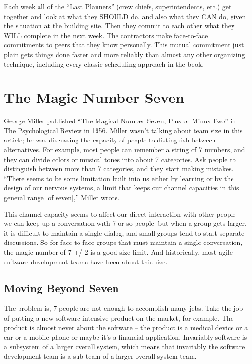 Each week all of the ``Last Planners'' (crew chiefs, superintendents, etc.) get together and look at what they SHOULD do, and also what they CAN do, given the situation at the building site. Then they commit to each other what they WILL complete in the next week. The contractors make face-to-face commitments to peers that they know personally. This mutual commitment just plain gets things done faster and more reliably than almost any other organizing technique, including every classic scheduling approach in the book.

\section*{The Magic Number Seven}

George Miller published “The Magical Number Seven, Plus or Minus Two” in The Psychological Review in 1956. Miller wasn’t talking about team size in this article; he was discussing the capacity of people to distinguish between alternatives. For example, most people can remember a string of 7 numbers, and they can divide colors or musical tones into about 7 categories. Ask people to distinguish between more than 7 categories, and they start making mistakes. “There seems to be some limitation built into us either by learning or by the design of our nervous systems, a limit that keeps our channel capacities in this general range [of seven],” Miller wrote.

This channel capacity seems to affect our direct interaction with other people – we can keep up a conversation with 7 or so people, but when a group gets larger, it is difficult to maintain a single dialog, and small groups tend to start separate discussions. So for face-to-face groups that must maintain a single conversation, the magic number of 7 +/-2 is a good size limit. And historically, most agile software development teams have been about this size.

\subsection*{Moving Beyond Seven}

The problem is, 7 people are not enough to accomplish many jobs. Take the job of putting a new software-intensive product on the market, for example. The product is almost never about the software – the product is a medical device or a car or a mobile phone or maybe it’s a financial application. Invariably software is a subsystem of a larger overall system, which means that invariably the software development team is a sub-team of a larger overall system team.

